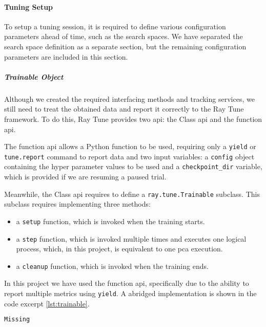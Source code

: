 \paragraph{Tuning Setup}

To setup a tuning session, it is required to define various configuration parameters ahead of time, such as the search spaces. We have separated the search space definition as a separate section, but the remaining configuration parameters are included in this section.


\subparagraph{Trainable Object}

Although we created the required interfacing methods and tracking services, we still need to treat the obtained data and report it correctly to the Ray Tune framework. To do this, Ray Tune provides two \acrshort{api}: the Class \acrshort{api} and the function \acrshort{api}. 

The function \acrshort{api} allows a Python function to be used, requiring only a \verb!yield! or \verb!tune.report! command to report data and two input variables: a \verb!config! object containing the hyper parameter values to be used and a \verb!checkpoint_dir! variable, which is provided if we are resuming a paused trial.

Meanwhile, the Class \acrshort{api} requires to define a \verb!ray.tune.Trainable! subclass. This subclass requires implementing three methods: 

\begin{itemize}
    \item a \verb!setup! function, which is invoked when the training starts.
    \item a \verb!step! function, which is invoked multiple times and executes one logical process, which, in this project, is equivalent to one \acrshort{pca} execution.
    \item a \verb!cleanup! function, which is invoked when the training ends.
\end{itemize}

In this project we have used the function \acrshort{api}, specifically due to the ability to report multiple metrics using \verb!yield!. A abridged implementation is shown in the code excerpt \ref{lst:trainable}.

\begin{lstlisting}[language=Python, caption=Example Trainable function, captionpos=b, label={lst:trainable}]
Missing
\end{lstlisting}



